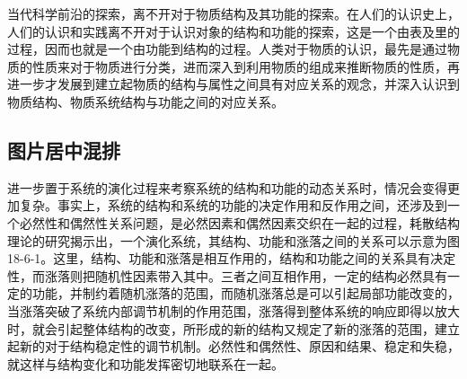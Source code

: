 \documentclass[UTF8]{ctexart}
\begin{document}
当代科学前沿的探索，离不开对于物质结构及其功能的探索。在人们的认识史上，人们的认识和实践离不开对于认识对象的结构和功能的探索，这是一个由表及里的过程，因而也就是一个由功能到结构的过程。人类对于物质的认识，最先是通过物质的性质来对于物质进行分类，进而深入到利用物质的组成来推断物质的性质，再进一步才发展到建立起物质的结构与属性之间具有对应关系的观念，并深入认识到物质结构、物质系统结构与功能之间的对应关系。


\subsection{图片居中混排}
\begin{window}
  进一步置于系统的演化过程来考察系统的结构和功能的动态关系时，情况会变得更加复杂。事实上，系统的结构和系统的功能的决定作用和反作用之间，还涉及到一个必然性和偶然性关系问题，是必然因素和偶然因素交织在一起的过程，耗散结构理论的研究揭示出，一个演化系统，其结构、功能和涨落之间的关系可以示意为图18-6-1。这里，结构、功能和涨落是相互作用的，结构和功能之间的关系具有决定性，而涨落则把随机性因素带入其中。三者之间互相作用，一定的结构必然具有一定的功能，并制约着随机涨落的范围，而随机涨落总是可以引起局部功能改变的，当涨落突破了系统内部调节机制的作用范围，涨落得到整体系统的响应即得以放大时，就会引起整体结构的改变，所形成的新的结构又规定了新的涨落的范围，建立起新的对于结构稳定性的调节机制。必然性和偶然性、原因和结果、稳定和失稳，就这样与结构变化和功能发挥密切地联系在一起。
\end{window}
\end{document}
